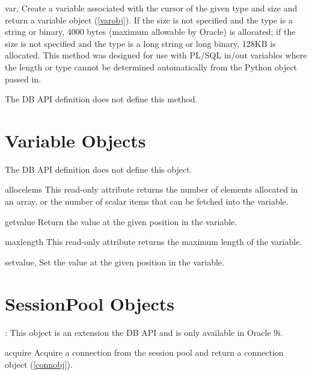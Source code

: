 \documentclass{manual}
\begin{document}
\begin{funcdesc}{var}{, }
  Create a variable associated with the cursor of the given type and size and
  return a variable object (\ref{varobj}). If the size is not specified and the
  type is a string or binary, 4000 bytes (maximum allowable by Oracle) is
  allocated; if the size is not specified and the type is a long string or long
  binary, 128KB is allocated. This method was designed for use with PL/SQL
  in/out variables where the length or type cannot be determined automatically
  from the Python object passed in.

   The DB API definition does not define this method.
\end{funcdesc}

\chapter{Variable Objects\label{varobj}}

 The DB API definition does not define this object.

\begin{datadesc}{allocelems}
  This read-only attribute returns the number of elements allocated in an
  array, or the number of scalar items that can be fetched into the variable.
\end{datadesc}

\begin{funcdesc}{getvalue}{}
  Return the value at the given position in the variable.
\end{funcdesc}

\begin{datadesc}{maxlength}
  This read-only attribute returns the maximum length of the variable.
\end{datadesc}

\begin{funcdesc}{setvalue}{, }
  Set the value at the given position in the variable.
\end{funcdesc}

\chapter{SessionPool Objects\label{sesspool}}

: This object is an extension the DB API and is only available in
Oracle 9i.

\begin{funcdesc}{acquire}{}
  Acquire a connection from the session pool and return a connection
  object (\ref{connobj}).
\end{funcdesc}
\end{document}
